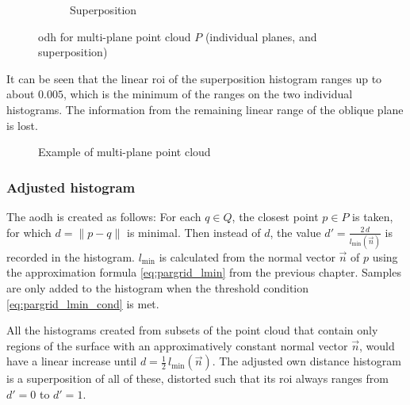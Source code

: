 \begin{figure}[H]
\begin{subfigure}{.32\textwidth}
	\caption{Superposition}
\end{subfigure}
\caption{\Gls{odh} for multi-plane point cloud $P$ (individual planes, and superposition)}
\label{fig:multiplane_cphist}
\end{figure}

It can be seen that the linear \gls{roi} of the superposition histogram ranges up to about $0.005$, which is the minimum of the ranges on the two individual histograms. The information from the remaining linear range of the oblique plane is lost.

\begin{figure}[h]
\centering
{
	\setlength{\fboxsep}{0pt}%
	\setlength{\fboxrule}{0.5pt}%
}
\caption{Example of multi-plane point cloud}
\label{fig:disks1}
\end{figure}


\subsubsection{Adjusted histogram}
The \gls{aodh} is created as follows: For each $q \in Q$, the closest point $p \in P$ is taken, for which $d = \|p - q\|$ is minimal. Then instead of $d$, the value $d' = \frac{2 \, d}{l_{\text{min}}(\vec{n})}$ is recorded in the histogram. $l_{\text{min}}$ is calculated from the normal vector $\vec{n}$ of $p$ using the approximation formula \ref{eq:pargrid_lmin} from the previous chapter. Samples are only added to the histogram when the threshold condition \ref{eq:pargrid_lmin_cond} is met.

All the histograms created from subsets of the point cloud that contain only regions of the surface with an approximatively constant normal vector $\vec{n}$, would have a linear increase until $d = \frac{1}{2} \, l_{\text{min}}(\vec{n})$. The adjusted own distance histogram is a superposition of all of these, distorted such that its \gls{roi} always ranges from $d' = 0$ to $d' = 1$.

